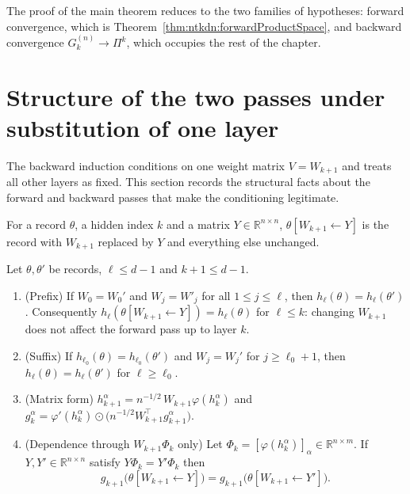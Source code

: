 The proof of the main theorem reduces to the two families of hypotheses: forward convergence, which is Theorem~\ref{thm:ntkdn:forwardProductSpace}, and backward convergence $G_k^{(n)}\to\Pi^k$, which occupies the rest of the chapter.


\section{Structure of the two passes under substitution of one layer}\label{sec:ntkdn:structure}

The backward induction conditions on one weight matrix $V=W_{k+1}$ and treats all other layers as fixed. This section records the structural facts about the forward and backward passes that make the conditioning legitimate.

\begin{definition}\label{def:ntkdn:updateWh}
  \leanok
For a record $\theta$, a hidden index $k$ and a matrix $Y\in\mathbb R^{n\times n}$, $\theta[W_{k+1}\leftarrow Y]$ is the record with $W_{k+1}$ replaced by $Y$ and everything else unchanged.
\end{definition}

\begin{lemma}\label{lem:ntkdn:congruence}
  \leanok
Let $\theta,\theta'$ be records, $\ell\le d-1$ and $k+1\le d-1$.
\begin{enumerate}
  \item (Prefix) If $W_0=W_0'$ and $W_j=W'_j$ for all $1\le j\le\ell$, then $h_\ell(\theta)=h_\ell(\theta')$. Consequently $h_\ell(\theta[W_{k+1}\leftarrow Y])=h_\ell(\theta)$ for $\ell\le k$: changing $W_{k+1}$ does not affect the forward pass up to layer $k$.
  \item (Suffix) If $h_{\ell_0}(\theta)=h_{\ell_0}(\theta')$ and $W_j=W_j'$ for $j\ge\ell_0+1$, then $h_\ell(\theta)=h_\ell(\theta')$ for $\ell\ge\ell_0$.
  \item (Matrix form) $h_{k+1}^\alpha=n^{-1/2}\,W_{k+1}\varphi(h_k^\alpha)$ and $g_k^\alpha=\varphi'(h_k^\alpha)\odot\bigl(n^{-1/2}W_{k+1}^\top g_{k+1}^\alpha\bigr)$.
  \item (Dependence through $W_{k+1}\Phi_k$ only) Let $\Phi_k=[\varphi(h_k^\alpha)]_{\alpha}\in\mathbb R^{n\times m}$. If $Y,Y'\in\mathbb R^{n\times n}$ satisfy $Y\Phi_k=Y'\Phi_k$ then
  \[
    g_{k+1}\bigl(\theta[W_{k+1}\leftarrow Y]\bigr)=g_{k+1}\bigl(\theta[W_{k+1}\leftarrow Y']\bigr).
  \]
\end{enumerate}
\end{lemma}

